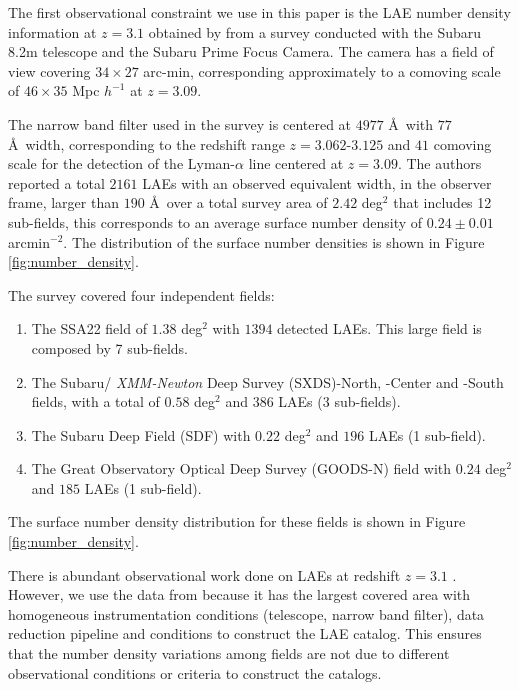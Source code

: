 \documentclass{emulateapj}
\newcommand{\hMpc}{{\ifmmode{h^{-1}{\rm Mpc}}\else{$h^{-1}$Mpc }\fi}}
\begin{document}
The first observational constraint we use in this paper is the LAE number
density information at $z=3.1$ obtained by \cite{Yamada2012} from a survey
conducted with the Subaru 8.2m telescope and the Subaru Prime Focus Camera.
The camera has a field of view covering $34\times 27$ arc-min,
corresponding approximately to a comoving scale of $46\times35$ Mpc
$h^{-1}$ at $z=3.09$.  

The narrow band filter used in the survey is
centered at $4977$ \AA~with  $77$ \AA~width, corresponding to the
redshift range $z=3.062$-$3.125$ and $41$ \hMpc comoving scale for the
detection of the Lyman-$\alpha$ line centered at $z=3.09$. The authors
reported a total  $2161$  LAEs with an observed equivalent width, in
the observer frame, larger than $190$ \AA~over a total survey area of
$2.42$ deg$^{2}$ that includes 12 sub-fields,  this corresponds to an
average surface number density of $0.24\pm 0.01$ arcmin$^{-2}$.  The
distribution of the surface number densities is shown in Figure
\ref{fig:number_density}. 

The survey covered four independent fields:

\begin{enumerate}
\item The SSA22
field of $1.38$ deg$^2$ with $1394$ detected LAEs. This large field is
composed by 7 sub-fields. 

\item The Subaru/{\it
  XMM-Newton} Deep Survey (SXDS)-North, -Center and -South fields, with a
total of $0.58$ deg$^2$ and $386$ LAEs (3 sub-fields).

\item The Subaru Deep Field (SDF) with $0.22$ deg$^2$ and
$196$ LAEs (1 sub-field).

\item The Great Observatory Optical Deep Survey  (GOODS-N) field with
  $0.24$ deg$^2$ and $185$ LAEs (1 sub-field).   
\end{enumerate}

The surface number density distribution for these fields is shown in
Figure \ref{fig:number_density}.

There is abundant observational work done on LAEs at redshift $z=3.1$
\citep{Kudritzki2000,Matsuda2005,Gawiser2007,Nilsson2007,Ouchi2008}.
However, we use the data from \cite{Yamada2012} because
it has the largest covered area with homogeneous instrumentation
conditions (telescope, narrow band filter), data reduction pipeline
and conditions to construct the LAE catalog. This ensures that the
number density variations among fields are not due to different
observational conditions or criteria to construct the catalogs.
\end{document}
